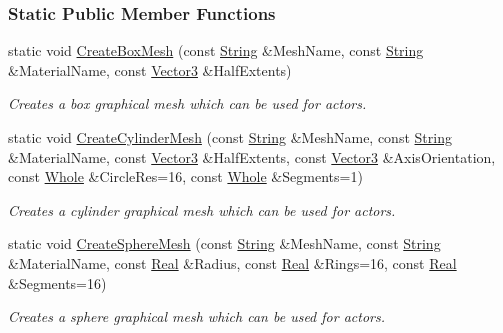 \subsubsection*{Static Public Member Functions}
\begin{DoxyCompactItemize}
\item 
static void \hyperlink{classphys_1_1MeshGenerator_a1710315174186367ce566125feb3df6d}{CreateBoxMesh} (const \hyperlink{namespacephys_aa03900411993de7fbfec4789bc1d392e}{String} \&MeshName, const \hyperlink{namespacephys_aa03900411993de7fbfec4789bc1d392e}{String} \&MaterialName, const \hyperlink{classphys_1_1Vector3}{Vector3} \&HalfExtents)
\begin{DoxyCompactList}\small\item\em Creates a box graphical mesh which can be used for actors. \item\end{DoxyCompactList}\item 
static void \hyperlink{classphys_1_1MeshGenerator_a7d7372e91e3d039c656f78be3cb5b951}{CreateCylinderMesh} (const \hyperlink{namespacephys_aa03900411993de7fbfec4789bc1d392e}{String} \&MeshName, const \hyperlink{namespacephys_aa03900411993de7fbfec4789bc1d392e}{String} \&MaterialName, const \hyperlink{classphys_1_1Vector3}{Vector3} \&HalfExtents, const \hyperlink{classphys_1_1Vector3}{Vector3} \&AxisOrientation, const \hyperlink{namespacephys_a460f6bc24c8dd347b05e0366ae34f34a}{Whole} \&CircleRes=16, const \hyperlink{namespacephys_a460f6bc24c8dd347b05e0366ae34f34a}{Whole} \&Segments=1)
\begin{DoxyCompactList}\small\item\em Creates a cylinder graphical mesh which can be used for actors. \item\end{DoxyCompactList}\item 
static void \hyperlink{classphys_1_1MeshGenerator_a2d1dfdfe8fae04773de67118a4513f5d}{CreateSphereMesh} (const \hyperlink{namespacephys_aa03900411993de7fbfec4789bc1d392e}{String} \&MeshName, const \hyperlink{namespacephys_aa03900411993de7fbfec4789bc1d392e}{String} \&MaterialName, const \hyperlink{namespacephys_af7eb897198d265b8e868f45240230d5f}{Real} \&Radius, const \hyperlink{namespacephys_af7eb897198d265b8e868f45240230d5f}{Real} \&Rings=16, const \hyperlink{namespacephys_af7eb897198d265b8e868f45240230d5f}{Real} \&Segments=16)
\begin{DoxyCompactList}\small\item\em Creates a sphere graphical mesh which can be used for actors. \item\end{DoxyCompactList}\end{DoxyCompactItemize}



